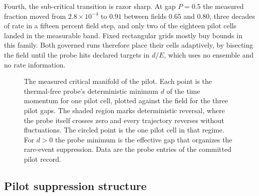 \documentclass[aps,prd,reprint,nofootinbib,longbibliography]{revtex4-2}
\begin{document}
Fourth, the sub-critical transition is razor sharp.  At gap $P = 0.5$
the measured fraction moved from $2.8\times10^{-4}$ to $0.91$ between
fields $0.65$ and $0.80$, three decades of rate in a fifteen percent
field step, and only two of the eighteen pilot cells landed in the
measurable band.  Fixed rectangular grids mostly buy bounds in this
family.  Both governed runs therefore place their cells adaptively, by
bisecting the field until the probe hits declared targets in $d/E$,
which uses no ensemble and no rate information.

\begin{figure}[t]
\centering
{}
\caption{The measured critical manifold of the pilot.  Each point is the
thermal-free probe's deterministic minimum $d$ of the time momentum for
one pilot cell, plotted against the field for the three pilot gaps.  The
shaded region marks deterministic reversal, where the probe itself
crosses zero and every trajectory reverses without fluctuations.  The
circled point is the one pilot cell in that regime.  For $d > 0$ the
probe minimum is the effective gap that organizes the rare-event
suppression.  Data are the probe entries of the committed pilot record.}
\label{fig:manifold}
\end{figure}

\subsection{Pilot suppression structure}
\end{document}
